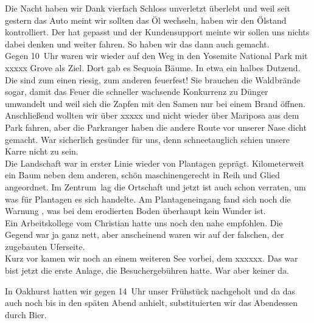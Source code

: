 Die Nacht haben wir Dank vierfach Schloss unverletzt überlebt und weil seit gestern das Auto meint wir sollten das Öl wechseln, haben wir den Ölstand kontrolliert.
Der hat gepasst und der Kundensupport meinte wir sollen uns nichts dabei denken und weiter fahren.
So haben wir das dann auch gemacht.\\

Gegen 10~Uhr waren wir wieder auf den Weg in den Yosemite National Park mit xxxxx Grove als Ziel.
Dort gab es Sequoia Bäume.
In etwa ein halbes Dutzend.
Die sind zum einen riesig, zum anderen feuerfest!
Sie brauchen die Waldbrände sogar, damit das Feuer die schneller wachsende Konkurrenz zu Dünger umwandelt und weil sich die Zapfen mit den Samen nur bei einem Brand öffnen.\\

Anschließend wollten wir über xxxxx und nicht wieder über Mariposa aus dem Park fahren, aber die Parkranger haben die andere Route vor unserer Nase dicht gemacht.
War sicherlich gesünder für uns, denn schneetauglich schien unsere Karre nicht zu sein.\\

Die Landschaft war in erster Linie wieder von Plantagen geprägt.
Kilometerweit ein Baum neben dem anderen, schön maschinengerecht in Reih und Glied angeordnet.
Im \glqq Zentrum\grqq \, lag die Ortschaft  und jetzt ist auch schon verraten, um was für Plantagen es sich handelte.
Am Plantageneingang fand sich noch die Warnung , was bei dem erodierten Boden überhaupt kein Wunder ist.\\

Ein Arbeitskollege vom Christian hatte uns noch den  nahe  empfohlen.
Die Gegend war ja ganz nett, aber anscheinend waren wir auf der falschen, der zugebauten Uferseite.\\

Kurz vor  kamen wir noch an einem weiteren See vorbei, dem xxxxxx.
Das war bist jetzt die erste Anlage, die Besuchergebühren hatte.
War aber keiner da.

\thispagestyle{empty}
\newpage


In Oakhurst hatten wir gegen 14~Uhr unser Frühstück nachgeholt und da das auch noch bis in den späten Abend anhielt, substituierten wir das Abendessen durch Bier.
